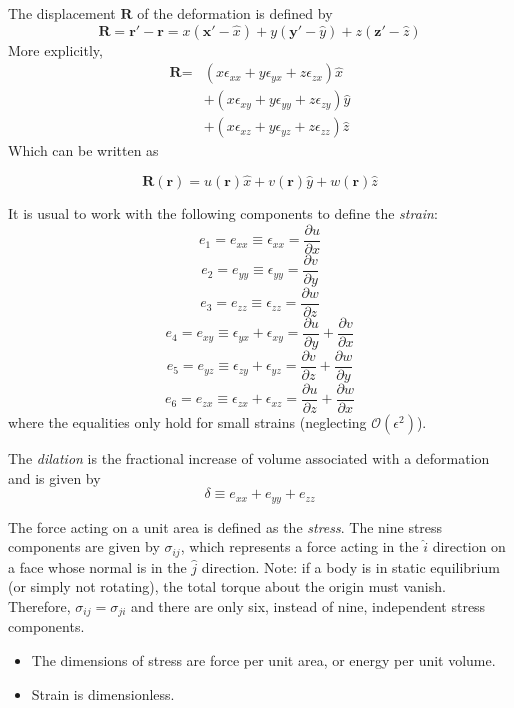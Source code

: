 \documentclass[10pt]{article}
\begin{document}
The displacement $\textbf{R}$ of the deformation is defined by
$$\textbf{R} = \textbf{r}' - \textbf{r} = x(\textbf{x}' - \hat{x}) + y(\textbf{y}' - \hat{y}) +z(\textbf{z}' - \hat{z})$$
More explicitly,
\begin{equation}
\begin{aligned}
  \textbf{R} = & (x\epsilon_{xx} + y\epsilon_{yx} + z\epsilon_{zx})\hat{x} \\
               & + (x\epsilon_{xy} + y\epsilon_{yy} + z\epsilon_{zy})\hat{y} \\
               & + (x\epsilon_{xz} + y\epsilon_{yz} + z\epsilon_{zz})\hat{z}
\end{aligned}
\end{equation}
Which can be written as

$$\textbf{R}(\textbf{r}) = u(\textbf{r})\hat{x} + v(\textbf{r})\hat{y} + w(\textbf{r})\hat{z}$$

It is usual to work with the following components to define the \emph{strain}:
$$e_{1} = e_{xx} \equiv \epsilon_{xx} = \frac{\partial u}{\partial x}$$
$$e_{2} = e_{yy} \equiv \epsilon_{yy} = \frac{\partial v}{\partial y}$$
$$e_{3} = e_{zz} \equiv \epsilon_{zz} = \frac{\partial w}{\partial z}$$
$$e_{4} = e_{xy} \equiv \epsilon_{yx} + \epsilon_{xy} = \frac{\partial u}{\partial y} + \frac{\partial v}{\partial x}$$
$$e_{5} = e_{yz} \equiv \epsilon_{zy} + \epsilon_{yz} = \frac{\partial v}{\partial z} + \frac{\partial w}{\partial y}$$
$$e_{6} = e_{zx} \equiv \epsilon_{zx} + \epsilon_{xz} = \frac{\partial u}{\partial z} + \frac{\partial w}{\partial x}$$
where the equalities only hold for small strains (neglecting $\mathcal{O}(\epsilon^{2})$).

The \emph{dilation} is the fractional increase of volume associated with a deformation and is given by
$$
\delta \equiv e_{xx} + e_{yy} + e_{zz}
$$

The force acting on a unit area is defined as the \emph{stress}. The nine stress components are given by
$\sigma_{ij}$, which represents a force acting in the $\hat{i}$ direction on a face whose normal is in the $\hat{j}$
direction. Note: if a body is in static equilibrium (or simply not rotating), the total torque about the origin must vanish.
Therefore, $\sigma_{ij} = \sigma_{ji}$ and there are only six, instead of nine, independent stress components.

\begin{itemize}
  \item The dimensions of stress are force per unit area, or energy per unit volume.
  \item Strain is dimensionless.
\end{itemize}
\end{document}
